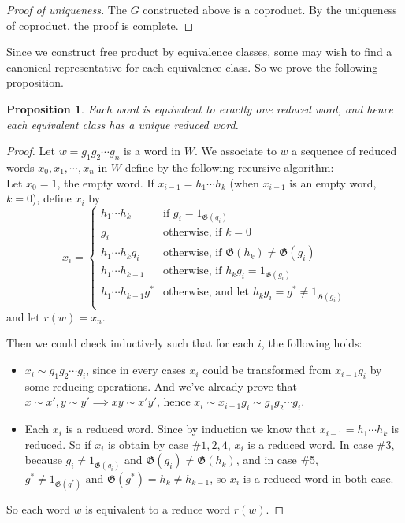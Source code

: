 \documentclass[a4paper,titlepage]{article}
\theoremstyle{remark}
\theoremstyle{definition}
\theoremstyle{definition}
\theoremstyle{plain}
\newtheorem{proposition}{Proposition}
\newcommand{\gid}{\mathfrak{G}}
\begin{document}
  \begin{proof}[Proof of uniqueness]
    The $G$ constructed above is a coproduct. By the uniqueness of coproduct, the proof is complete.
  \end{proof}

  Since we construct free product by equivalence classes, some may wish to find a canonical
  representative for each equivalence class. So we prove the following proposition.

  \begin{proposition}
    Each word is equivalent to exactly one reduced word, and hence each equivalent class
    has a unique reduced word.
  \end{proposition}

  \begin{proof}
    Let $w = g_1 g_2 \cdots g_n$ is a word in $W$. We associate to $w$ a sequence of reduced words
    $x_0, x_1, \cdots, x_n$ in $W$ define by the following recursive algorithm: \\
    Let $x_0 = 1$, the empty word. If $x_{i-1} = h_1 \cdots h_k$ (when $x_{i-1}$ is an empty word, $k = 0$),
    define $x_i$ by
    \[
      x_i = \begin{cases}
        h_1 \cdots h_k & \text{if } g_i = 1_{\gid(g_i)} \\
        g_i & \text{otherwise, if } k = 0 \\
        h_1 \cdots h_k g_i & \text{otherwise, if } \gid(h_k) \neq \gid(g_i) \\
        h_1 \cdots h_{k-1} & \text{otherwise, if } h_k g_i = 1_{\gid(g_i)} \\
        h_1 \cdots h_{k-1} g^* & \text{otherwise, and let } h_k g_i = g^* \neq 1_{\gid(g_i)} \\
      \end{cases}
    \]
    and let $r(w) = x_n$.

    Then we could check inductively such that for each $i$, the following holds:
    \begin{itemize}
      \item $x_i \sim g_1 g_2 \cdots g_i$, since in every cases $x_i$ could be transformed from $x_{i-1} g_i$
        by some reducing operations. And we've already prove that $x \sim x', y \sim y' \implies xy \sim x'y'$,
        hence $x_i \sim x_{i-1} g_i \sim g_1 g_2 \cdots g_i$.
      \item Each $x_i$ is a reduced word. Since by induction we know that $x_{i-1} = h_1 \cdots h_k$ is reduced. 
        So if $x_i$ is obtain by case \#$1, 2, 4$, $x_i$ is a reduced word. In case \#3, because $g_i \neq 1_{\gid(g_i)}$
        and $\gid(g_i) \neq \gid(h_k)$, and in case \#5, $g^* \neq 1_{\gid(g^*)} \text{ and } \gid(g^*) = h_k \neq h_{k-1}$,
        so $x_i$ is a reduced word in both case.
    \end{itemize}
    So each word $w$ is equivalent to a reduce word $r(w)$.


\end{proof}
\end{document}
